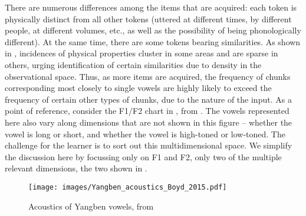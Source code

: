 There are numerous differences among the items that are acquired: each token is physically distinct from all other tokens (uttered at different times, by different people, at different volumes, etc., as well as the possibility of being phonologically different). At the same time, there are some tokens bearing similarities. As shown in \citet{Lindblom:2000}, incidences of physical properties cluster in some areas and are sparse in others, urging identification of certain similarities due to density in the observational space. Thus, as more items are acquired, the frequency of chunks corresponding most closely to single vowels are highly likely to exceed the frequency of certain other types of chunks, due to the nature of the input. As a point of reference, consider the F1/F2 chart in , from \citet{Boyd:2015}. The vowels represented here also vary along dimensions  that are not shown in this figure -- whether the vowel is long or short, and whether the vowel is high-toned or low-toned. The challenge for the learner is to sort out this multidimensional space. We simplify the discussion here by focussing only on F1 and F2, only two of the multiple relevant dimensions, the two shown in .

\begin{figure} 
\caption{Acoustics of Yangben vowels, from \citet[238]{Boyd:2015}\label{Yangben-formants}}
\texttt{[image: images/Yangben\_acoustics\_Boyd\_2015.pdf]}
\end{figure}


